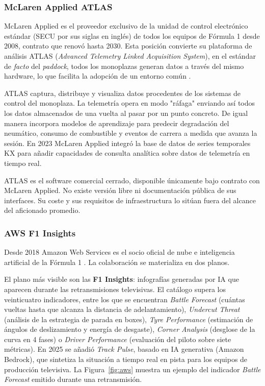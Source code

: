 \documentclass[12pt,a4paper,twoside,openright]{book}
\begin{document}
\subsubsection{McLaren Applied ATLAS}
McLaren Applied es el proveedor exclusivo de la unidad de control electrónico estándar (SECU por sus siglas en inglés) de todos los equipos de Fórmula 1 desde 2008, contrato que renovó hasta 2030.
Esta posición convierte su plataforma de análisis ATLAS (\textit{Advanced Telemetry Linked Acquisition System}), en el estándar de \textit{facto} del \textit{paddock}, todos los monoplazas generan datos a través del mismo hardware, lo que facilita la adopción de un entorno común \cite{atlas}.

\medskip
\noindent ATLAS captura, distribuye y visualiza datos procedentes de los sistemas de control del monoplaza. La telemetría opera en modo "ráfaga" enviando así todos los datos almacenados de una vuelta al pasar por un punto concreto. De igual manera incorpora modelos de aprendizaje para predecir
degradación del neumático, consumo de combustible y eventos de carrera a medida que avanza la sesión. En 2023 McLaren Applied integró la base de datos de series temporales KX para añadir capacidades de consulta analítica sobre datos de telemetría en tiempo real.

\noindent ATLAS es el software comercial cerrado, disponible únicamente bajo contrato con McLaren Applied. No existe versión libre ni documentación pública de sus interfaces. Su coste y sus requisitos de infraestructura lo sitúan fuera del alcance del aficionado promedio.

\subsubsection{AWS F1 Insights}
Desde 2018 Amazon Web Services es el socio oficial de nube e inteligencia artificial de la Fórmula 1 \cite{awsf1}. La colaboración se materializa en dos planos.

\noindent El plano más visible son las \textbf{F1 Insights}: infografías generadas por IA que aparecen durante las retransmisiones televisivas. El catálogo supera los veinticuatro indicadores, entre los que se encuentran
\textit{Battle Forecast} (cuántas vueltas hasta que alcanza la distancia de adelantamiento), \textit{Undercut Threat} (análisis de la estrategia de parada en boxes), \textit{Tyre Performance} (estimación de ángulos de deslizamiento y energía de desgaste), \textit{Corner Analysis} (desglose de la curva en 4 fases) o \textit{Driver Performance} (evaluación del piloto sobre siete métricas).
En 2025 se añadió \textit{Track Pulse}, basado en IA generativa (Amazon Bedrock), que sintetiza la situación a tiempo real en pista para los equipos de producción televisiva. La Figura~\ref{fig:aws} muestra un ejemplo del indicador \textit{Battle Forecast} emitido durante una retransmisión.
\end{document}
